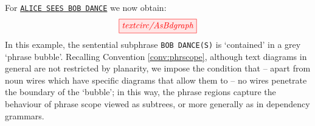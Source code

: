 \begin{example}  
For \texttt{\underline{ALICE SEES BOB DANCE}} we now obtain:
\[
\tikzfig{textcirc/AsBdgraph}
\]
In this example, the sentential subphrase \texttt{BOB DANCE(S)} is `contained' in a grey `phrase bubble'. Recalling Convention \ref{conv:phrscope}, although text diagrams in general are not restricted by planarity, we impose the condition that -- apart from noun wires which have specific diagrams that allow them to -- no wires penetrate the boundary of the `bubble'; in this way, the phrase regions capture the behaviour of phrase scope viewed as subtrees, or more generally as in dependency grammars.
\end{example}

